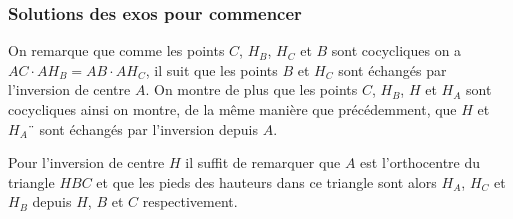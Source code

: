 \newpage

\subsubsection{Solutions des exos pour commencer}

\begin{sol}

On remarque que comme les points $C$, $H_B$, $H_C$ et $B$ sont cocycliques on a $AC\cdot AH_B=AB\cdot AH_C$, il suit que les points $B$ et $H_C$ sont échangés par l'inversion de centre $A$. On montre de plus que les points $C$, $H_B$, $H$ et $H_A$ sont cocycliques ainsi on montre, de la même manière que précédemment, que $H$ et $H_A¨$ sont échangés par l'inversion depuis $A$.

Pour l'inversion de centre $H$ il suffit de remarquer que $A$ est l'orthocentre du triangle $HBC$ et que les pieds des hauteurs dans ce triangle sont alors $H_A$, $H_C$ et $H_B$ depuis $H$, $B$ et $C$ respectivement.
\end{sol}

